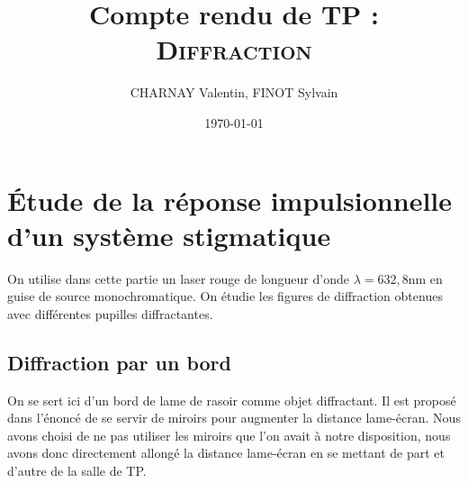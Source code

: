 \documentclass[12pt,a4paper]{article}
\author{CHARNAY Valentin, FINOT Sylvain}
\title{Compte rendu de TP :\\[4pt] \scshape Diffraction}
\date{\today}
\begin{document}
	\maketitle
	\section{Étude de la réponse impulsionnelle d'un système stigmatique}
	On utilise dans cette partie un laser rouge de longueur d'onde $\lambda=632,8$nm en guise de source monochromatique. On étudie les figures de diffraction obtenues avec différentes pupilles diffractantes.
	\subsection{Diffraction par un bord}
	On se sert ici d'un bord de lame de rasoir comme objet diffractant. Il est proposé dans l'énoncé de se servir de miroirs pour augmenter la distance lame-écran. Nous avons choisi de ne pas utiliser les miroirs que l'on avait à notre disposition, nous avons donc directement allongé la distance lame-écran en se mettant de part et d'autre de la salle de TP.
	
\end{document}
